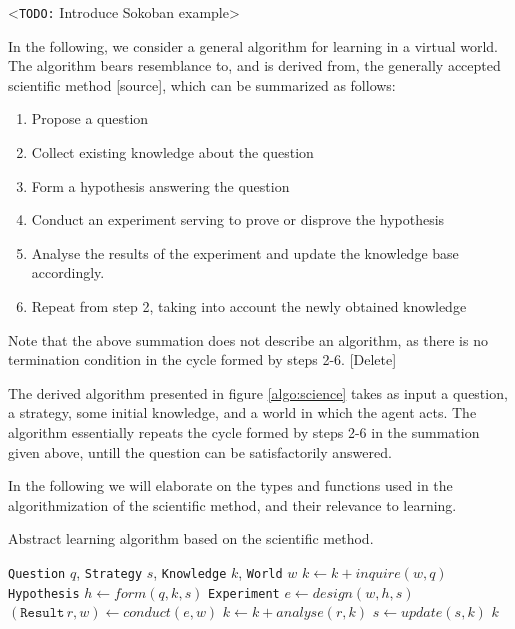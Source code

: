 \documentclass[master.tex]{subfiles}
\begin{document}
<\texttt{TODO:} Introduce Sokoban example>

In the following, we consider a general algorithm for learning in a virtual world. The algorithm bears resemblance to, and is derived from, the generally accepted scientific method [source], which can be summarized as follows:

\begin{enumerate}
    \item Propose a question
    \item Collect existing knowledge about the question
    \item Form a hypothesis answering the question
    \item Conduct an experiment serving to prove or disprove the hypothesis
    \item Analyse the results of the experiment and update the knowledge base accordingly.
    \item Repeat from step 2, taking into account the newly obtained knowledge
\end{enumerate}

Note that the above summation does not describe an algorithm, as there is no termination condition in the cycle formed by steps 2-6. [Delete]

The derived algorithm presented in figure \ref{algo:science} takes as input a question, a strategy, some initial knowledge, and a world in which the agent acts. The algorithm essentially repeats the cycle formed by steps 2-6 in the summation given above, untill the question can be satisfactorily answered.

In the following we will elaborate on the types and functions used in the algorithmization of the scientific method, and their relevance to learning.

\begin{algorithm}
    \caption{Abstract learning algorithm based on the scientific method.}
    \label{algo:science}

    \begin{algorithmic}
         {\texttt{Question} $q$, \texttt{Strategy} $s$, \texttt{Knowledge} $k$, \texttt{World} $w$}
                \State $k \gets k + inquire(w, q)$
                \State \texttt{Hypothesis} $h \gets form(q, k, s)$
                \State \texttt{Experiment} $e \gets design(w, h, s)$
                \State $(\texttt{Result} \, r, w) \gets conduct(e, w)$
                \State $k \gets k + analyse(r, k)$
                \State $s \gets update(s, k)$
            \EndWhile
            \State \Return $k$
        \EndFunction
    \end{algorithmic}
\end{algorithm}
\end{document}
